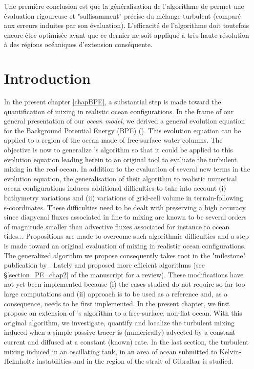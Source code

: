 Une première conclusion est que la généralisation de l'algorithme de \cite{winters_available_1995} permet une évaluation rigoureuse et "suffisamment" précise du mélange turbulent (comparé aux erreurs induites par son évaluation). L'efficacité de l'algorithme doit toutefois encore être optimisée avant que ce dernier ne soit appliqué à très haute résolution à des régions océaniques d'extension conséquente.

\section{Introduction}
In the present chapter \ref{chapBPE}, a substantial step is made toward the quantification of mixing in realistic ocean configurations. In the frame of our general presentation of our \textit{ocean model}, we derived a general evolution equation for the Background Potential Energy (BPE) (). This evolution equation can be applied to a region of the ocean made of free-surface water columns. The objective is now to generalize \cite{winters_available_1995}'s algorithm so that it could be applied to this evolution equation leading herein to an original tool to evaluate the turbulent mixing in the real ocean. In addition to the evaluation of several new terms in the evolution equation, the generalisation of their algorithm to realistic numerical ocean configurations induces additional difficulties to take into account (i) bathymetry variations and (ii) variations of grid-cell volume in terrain-following s-coordinates. These difficulties need to be dealt with preserving a high accuracy since diapycnal fluxes associated in fine to mixing are known to be several orders of magnitude smaller than advective fluxes associated for instance to ocean tides...
Propositions are made to overcome such algorithmic difficulties and a step is made toward an original evaluation of mixing in realistic ocean configurations.\\
The generalized algorithm we propose consequently takes root in the "milestone" publication by \citep{winters_available_1995}. Lately \cite{saenz_estimating_2015} and \cite{tailleux_local_2018} proposed more efficient algorithms (see \S \ref{section_PE_chap2} of the manuscript for a review). These modifications have not yet been implemented because (i) the cases studied do not require so far too large computations and (ii) \cite{winters_available_1995} approach is to be used as a reference and, as a consequence, needs to be first implemented.
In the present chapter, we first propose an extension of \cite{winters_available_1995}'s algorithm to a free-surface, non-flat ocean. With this original algorithm, we investigate, quantify and localize the turbulent mixing induced when a simple passive tracer is (numerically) advected by a constant current and diffused at a constant (known) rate. In the last section, the turbulent mixing induced in an oscillating tank, in an area of ocean submitted to Kelvin-Helmholtz instabilities and in the region of the strait of Gibraltar is studied.

